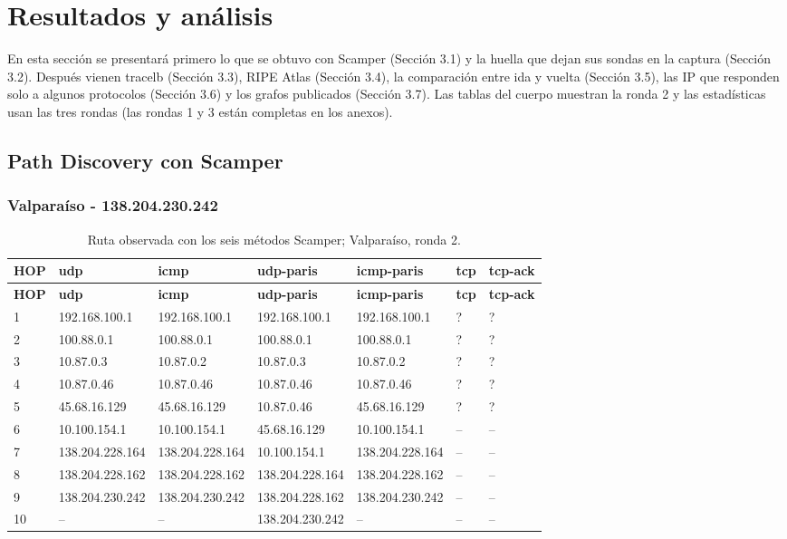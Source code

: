 \clearpage
\section{Resultados y análisis}\label{sec:resultados}

En esta sección se presentará primero lo que se obtuvo con Scamper (Sección 3.1) y la huella que dejan sus sondas en la captura (Sección 3.2). Después vienen tracelb (Sección 3.3), RIPE Atlas (Sección 3.4), la comparación entre ida y vuelta (Sección 3.5), las IP que responden solo a algunos protocolos (Sección 3.6) y los grafos publicados (Sección 3.7). Las tablas del cuerpo muestran la ronda 2 y las estadísticas usan las tres rondas (las rondas 1 y 3 están completas en los anexos).


\subsection{Path Discovery con Scamper}\label{sec:scamper}
\subsubsection{Valparaíso - 138.204.230.242}
\begingroup
\fontsize{8}{10}\selectfont
\begin{longtable}{p{0.8cm}p{2.25cm}p{2.25cm}p{2.25cm}p{2.25cm}p{2.25cm}p{2.25cm}}
\caption{Ruta observada con los seis métodos Scamper; Valparaíso, ronda 2.}\label{tabla1:138.204.230.242} \\
\toprule
\textbf{HOP} & \textbf{udp} & \textbf{icmp} & \textbf{udp-paris} & \textbf{icmp-paris} & \textbf{tcp} & \textbf{tcp-ack} \\ \midrule
\endfirsthead
\toprule
\textbf{HOP} & \textbf{udp} & \textbf{icmp} & \textbf{udp-paris} & \textbf{icmp-paris} & \textbf{tcp} & \textbf{tcp-ack} \\ \midrule
\endhead
1 & 192.168.100.1 & 192.168.100.1 & 192.168.100.1 & 192.168.100.1 & ? & ? \\
2 & 100.88.0.1 & 100.88.0.1 & 100.88.0.1 & 100.88.0.1 & ? & ? \\
3 & 10.87.0.3 & 10.87.0.2 & 10.87.0.3 & 10.87.0.2 & ? & ? \\
4 & 10.87.0.46 & 10.87.0.46 & 10.87.0.46 & 10.87.0.46 & ? & ? \\
5 & 45.68.16.129 & 45.68.16.129 & 10.87.0.46 & 45.68.16.129 & ? & ? \\
6 & 10.100.154.1 & 10.100.154.1 & 45.68.16.129 & 10.100.154.1 & -- & -- \\
7 & 138.204.228.164 & 138.204.228.164 & 10.100.154.1 & 138.204.228.164 & -- & -- \\
8 & 138.204.228.162 & 138.204.228.162 & 138.204.228.164 & 138.204.228.162 & -- & -- \\
9 & 138.204.230.242 & 138.204.230.242 & 138.204.228.162 & 138.204.230.242 & -- & -- \\
10 & -- & -- & 138.204.230.242 & -- & -- & -- \\
\bottomrule
\end{longtable}
\endgroup


